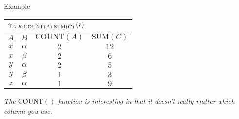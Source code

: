 \begin{multicols}{2}
\begin{CheatsheetEntryFrame}
\begin{RelAlgSubsection}{Example}
\begin{center}
{                \begin{tabular}{|cccc|}
                    \multicolumn{4}{l}{\normalsize $\operatorname{\gamma}_{A, B, \text{COUNT}(A), \text{SUM}(C)}{(r)}$}
                        \\ \hline
                    \multicolumn{1}{|c}{$A$}
                        & \multicolumn{1}{c}{$B$}
                        & \multicolumn{1}{c}{$\text{COUNT}(A)$}
                        & \multicolumn{1}{c|}{$\text{SUM}(C)$}
                        \\ \hline\hline
                    $x$ & $\alpha$ & $2$ & $12$ \\
                    $x$ & $\beta $ & $2$ & $6$ \\
                    $y$ & $\alpha$ & $2$ & $5$ \\
                    $y$ & $\beta $ & $1$ & $3$ \\
                    $z$ & $\alpha$ & $1$ & $9$ \\ \hline
                \end{tabular}
            }
        \end{center}
        \medskip
        {\footnotesize%
            \textit{The $\text{COUNT}()$ function is interesting in that it doesn't really matter which column you use.}
        }
        \end{RelAlgSubsection}

    \end{CheatsheetEntryFrame}
    
\end{multicols}

